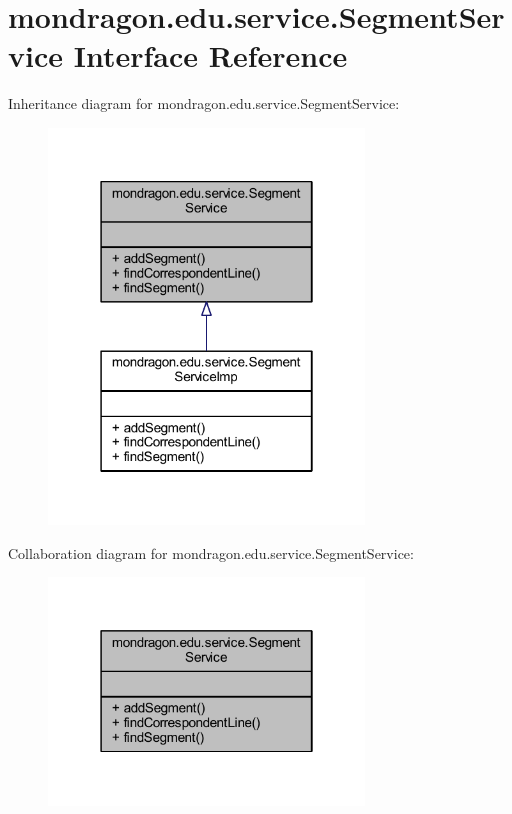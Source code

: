 \hypertarget{interfacemondragon_1_1edu_1_1service_1_1_segment_service}{}\section{mondragon.\+edu.\+service.\+Segment\+Service Interface Reference}
\label{interfacemondragon_1_1edu_1_1service_1_1_segment_service}


Inheritance diagram for mondragon.\+edu.\+service.\+Segment\+Service\+:\nopagebreak
\begin{figure}[H]
\begin{center}
\leavevmode
\includegraphics[width=238pt]{interfacemondragon_1_1edu_1_1service_1_1_segment_service__inherit__graph}
\end{center}
\end{figure}


Collaboration diagram for mondragon.\+edu.\+service.\+Segment\+Service\+:\nopagebreak
\begin{figure}[H]
\begin{center}
\leavevmode
\includegraphics[width=238pt]{interfacemondragon_1_1edu_1_1service_1_1_segment_service__coll__graph}
\end{center}
\end{figure}
